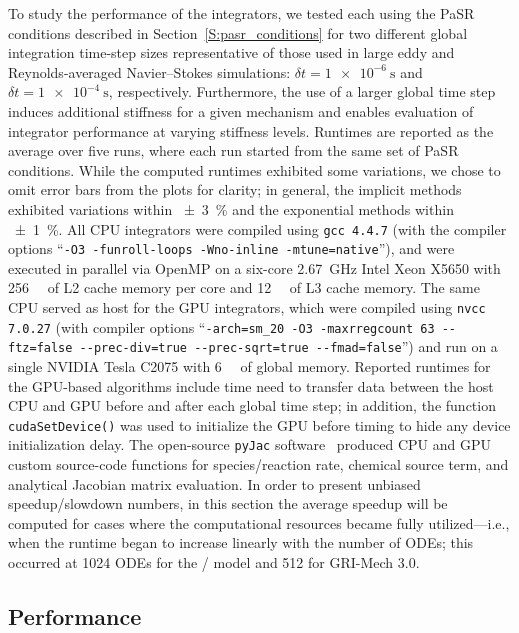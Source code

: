 \documentclass[preprint]{elsarticle}
\begin{document}
To study the performance of the integrators, we tested each using the PaSR conditions described in Section~\ref{S:pasr_conditions} for two different global integration time-step sizes representative of those used in large eddy and Reynolds-averaged Navier--Stokes simulations: $\delta t = \SI{1e-6}{\s}$ and $\delta t = \SI{1e-4}{\s}$, respectively.
Furthermore, the use of a larger global time step induces additional stiffness for a given mechanism and enables evaluation of integrator performance at varying stiffness levels.
Runtimes are reported as the average over five runs, where each run started from the same set of PaSR conditions.
While the computed runtimes exhibited some variations, we chose to omit error bars from the plots for clarity; in general, the implicit methods exhibited variations within \SI{\pm3}{\percent} and the exponential methods within \SI{\pm1}{\percent}.
All CPU integrators were compiled using \texttt{gcc 4.4.7} (with the compiler options ``\texttt{-O3 -funroll-loops -Wno-inline -mtune=native}''), and were executed in parallel via OpenMP on a six-core \SI{2.67}{\giga\hertz} Intel Xeon X5650 with \SI{256}{\kilo\byte} of L2 cache memory per core and \SI{12}{\mega\byte} of L3 cache memory.
The same CPU served as host for the GPU integrators, which were compiled using \texttt{nvcc 7.0.27} (with compiler options ``\texttt{-arch=sm\_20 -O3 -maxrregcount 63 -{}-ftz=false -{}-prec-div=true -{}-prec-sqrt=true -{}-fmad=false}'') and run on a single NVIDIA Tesla C2075 with \SI{6}{\giga\byte} of global memory.
Reported runtimes for the GPU-based algorithms include time need to transfer data between the host CPU and GPU before and after each global time step; in addition, the function \texttt{cudaSetDevice()} was used to initialize the GPU before timing to hide any device initialization delay.
The open-source \texttt{pyJac} software~\cite{Niemeyer:2015im,Niemeyer:2015ws} produced CPU and GPU custom source-code functions for species\slash reaction rate, chemical source term, and analytical Jacobian matrix evaluation.
In order to present unbiased speedup\slash slowdown numbers, in this section the average speedup will be computed for cases where the computational resources became fully utilized---i.e., when the runtime began to increase linearly with the number of ODEs; this occurred at \num{1024} ODEs for the \slash{} model and \num{512} for GRI-Mech 3.0.

\subsection{Performance}
\end{document}
